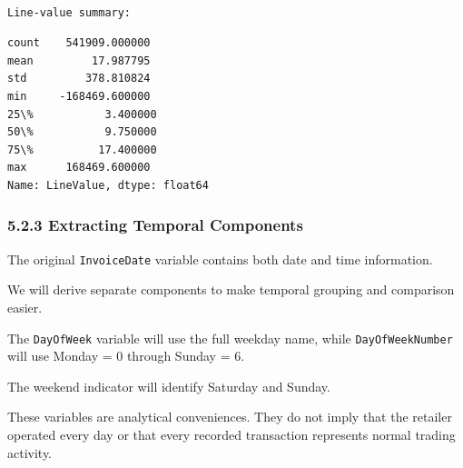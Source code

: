 \documentclass[11pt]{article}
\begin{document}
    
    \begin{Verbatim}[commandchars=\\\{\}]

Line-value summary:
    \end{Verbatim}

    
    \begin{Verbatim}[commandchars=\\\{\}]
count    541909.000000
mean         17.987795
std         378.810824
min     -168469.600000
25\%           3.400000
50\%           9.750000
75\%          17.400000
max      168469.600000
Name: LineValue, dtype: float64
    \end{Verbatim}

    
    \subsubsection{5.2.3 Extracting Temporal
Components}\label{extracting-temporal-components}

The original \texttt{InvoiceDate} variable contains both date and time
information.

We will derive separate components to make temporal grouping and
comparison easier.

The \texttt{DayOfWeek} variable will use the full weekday name, while
\texttt{DayOfWeekNumber} will use Monday = 0 through Sunday = 6.

The weekend indicator will identify Saturday and Sunday.

These variables are analytical conveniences. They do not imply that the
retailer operated every day or that every recorded transaction
represents normal trading activity.
\end{document}
